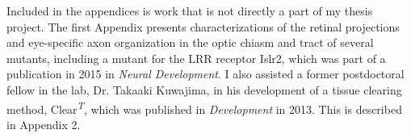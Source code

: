 Included in the appendices is work that is not directly a part of my thesis project.
The first Appendix presents characterizations of the retinal projections and eye-specific axon organization in the optic chiasm and tract of several mutants, including a mutant for the LRR receptor Islr2, which was part of a publication in 2015 in \emph{Neural Development}.
I also assisted a former postdoctoral fellow in the lab, Dr. Takaaki Kuwajima, in his development of a tissue clearing method, Clear\textsuperscript{\emph{T}}, which was published in \emph{Development} in 2013.
This is described in Appendix 2.
